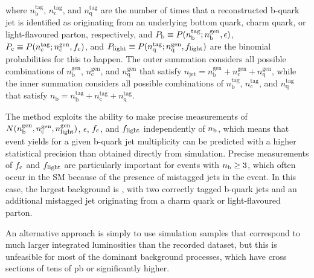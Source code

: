 where $n_{\textrm{b}}^{\textrm{tag}}$,
$n_{\textrm{c}}^{\textrm{tag}}$, and $n_{\textrm{q}}^{\textrm{tag}}$
are the number of times that a reconstructed b-quark jet is identified
as originating from an underlying bottom quark, charm quark, or
light-flavoured parton, respectively, and $P_{\rm b} \equiv
P(n_{\textrm{b}}^{\textrm{tag}} ; n_{\textrm{b}}^{\textrm{gen}},
\epsilon)$, $P_{\rm c} \equiv P(n_{\textrm{c}}^{\textrm{tag}} ;
n_{\textrm{c}}^{\textrm{gen}}, f_{\rm c})$, and $P_{\rm light} \equiv
P(n_{\textrm{q}}^{\textrm{tag}} ; n_{\textrm{q}}^{\textrm{gen}},
f_{\rm light})$ are the binomial probabilities for this to happen.
The outer summation considers all possible combinations of
$n_{\textrm{b}}^{\textrm{gen}}$, $n_{\textrm{c}}^{\textrm{gen}}$, and
$n_{\textrm{q}}^{\textrm{gen}}$ that satisfy $n_{\textrm{jet}} =
n_{\textrm{b}}^{\textrm{gen}} + n_{\textrm{c}}^{\textrm{gen}} +
n_{\textrm{q}}^{\textrm{gen}}$, while the inner summation considers
all possible combinations of $n_{\textrm{b}}^{\textrm{tag}}$,
$n_{\textrm{c}}^{\textrm{tag}}$, and $n_{\textrm{q}}^{\textrm{tag}}$
that satisfy $n_{\textrm{b}} = n_{\textrm{b}}^{\textrm{tag}} +
n_{\textrm{c}}^{\textrm{tag}} + n_{\textrm{q}}^{\textrm{tag}}$.
  
The method exploits the ability to make precise measurements of
$N(n_{\rm b}^{\rm gen},n_{\rm c}^{\rm gen},n_{\rm light}^{\rm gen})$,
$\epsilon$, $f_{\rm c}$, and $f_{\rm light}$ independently of $n_{\rm
  b}$, which means that event yields for a given b-quark jet
multiplicity can be predicted with a higher statistical precision than
obtained directly from simulation. Precise measurements of $f_{\rm c}$
and $f_{\rm light}$ are particularly important for events with $n_{\rm
  b} \geq 3$, which often occur in the SM because of the presence of
mistagged jets in the event. In this case, the largest background is
\ttbar, with two correctly tagged b-quark jets and an additional
mistagged jet originating from a charm quark or light-flavoured
parton.

An alternative approach is simply to use simulation samples that
correspond to much larger integrated luminosities than the recorded
dataset, but this is unfeasible for most of the dominant background
processes, which have cross sections of tens of pb or significantly
higher.


